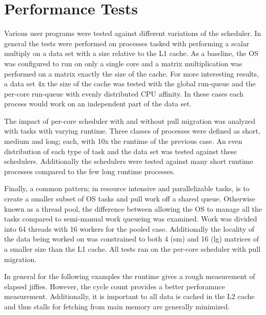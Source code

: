 \documentclass[11pt, twocolumn]{proc}
\begin{document}
\section{Performance Tests}
\label{sec:perfTests}
Various user programs were tested against different variations of the scheduler.  In general the tests were performed on processes tasked with performing a scalar multiply on a data set with a size relative to the L1 cache.  As a baseline, the OS was configured to run on only a single core and a matrix multiplication was performed on a matrix exactly the size of the cache.  For more interesting results, a data set 4x the size of the cache was tested with the global run-queue and the per-core run-queue with evenly distributed CPU affinity.  In these cases each process would work on an independent part of the data set.  

The impact of per-core scheduler with and without pull migration was analyzed with tasks with varying runtime.  Three classes of processes were defined as short, medium and long; each, with 10x the runtime of the previous case.  An even distribution of each type of task and the data set was tested against these schedulers.  Additionally the schedulers were tested against many short runtime processes compared to the few long runtime processes.

Finally, a common pattern; in resource intensive and parallelizable tasks, is to create a smaller subset of OS tasks and pull work off a shared queue.  Otherwise known as a thread pool, the difference between allowing the OS to manage all the tasks compared to semi-manual work queueing was examined.  Work was divided into 64 threads with 16 workers for the pooled case.  Additionally the locality of the data being worked on was constrained to both 4 (sm) and 16 (lg) matrices of a smaller size than the L1 cache.  All tests ran on the per-core scheduler with pull migration.  

In general for the following examples the runtime gives a rough measurement of elapsed jiffies.  However, the cycle count provides a better perforamnce measurement.  Additionally, it is important to all data is cached in the L2 cache and thus stalls for fetching from main memory are generally minimized.

\begin{table}[h!]
    \centering
    \caption{single core - matrix 1x utilization}
\end{table}
\end{document}
